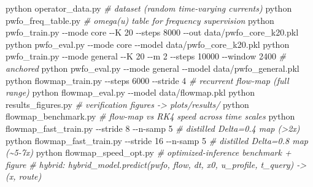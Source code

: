 \documentclass[
  11pt,
]{article}
\newenvironment{Shaded}{}{}
\newcommand{\AttributeTok}[1]{\textcolor[rgb]{0.49,0.56,0.16}{#1}}
\newcommand{\CommentTok}[1]{\textcolor[rgb]{0.38,0.63,0.69}{\textit{#1}}}
\newcommand{\ExtensionTok}[1]{#1}
\newcommand{\NormalTok}[1]{#1}
\begin{document}
\begin{Shaded}
\begin{Highlighting}[]
\ExtensionTok{python}\NormalTok{ operator\_data.py                                   }\CommentTok{\# dataset (random time{-}varying currents)}
\ExtensionTok{python}\NormalTok{ pwfo\_freq\_table.py                                 }\CommentTok{\# omega(u) table for frequency supervision}
\ExtensionTok{python}\NormalTok{ pwfo\_train.py }\AttributeTok{{-}{-}mode}\NormalTok{ core }\AttributeTok{{-}{-}K}\NormalTok{ 20 }\AttributeTok{{-}{-}steps}\NormalTok{ 8000  }\AttributeTok{{-}{-}out}\NormalTok{ data/pwfo\_core\_k20.pkl}
\ExtensionTok{python}\NormalTok{ pwfo\_eval.py  }\AttributeTok{{-}{-}mode}\NormalTok{ core   }\AttributeTok{{-}{-}model}\NormalTok{ data/pwfo\_core\_k20.pkl}
\ExtensionTok{python}\NormalTok{ pwfo\_train.py }\AttributeTok{{-}{-}mode}\NormalTok{ general }\AttributeTok{{-}{-}K}\NormalTok{ 20 }\AttributeTok{{-}{-}m}\NormalTok{ 2 }\AttributeTok{{-}{-}steps}\NormalTok{ 10000 }\AttributeTok{{-}{-}window}\NormalTok{ 2400   }\CommentTok{\# anchored}
\ExtensionTok{python}\NormalTok{ pwfo\_eval.py  }\AttributeTok{{-}{-}mode}\NormalTok{ general }\AttributeTok{{-}{-}model}\NormalTok{ data/pwfo\_general.pkl}
\ExtensionTok{python}\NormalTok{ flowmap\_train.py }\AttributeTok{{-}{-}steps}\NormalTok{ 6000 }\AttributeTok{{-}{-}stride}\NormalTok{ 4           }\CommentTok{\# recurrent flow{-}map (full range)}
\ExtensionTok{python}\NormalTok{ flowmap\_eval.py  }\AttributeTok{{-}{-}model}\NormalTok{ data/flowmap.pkl}
\ExtensionTok{python}\NormalTok{ results\_figures.py                                 }\CommentTok{\# verification figures {-}\textgreater{} plots/results/}
\ExtensionTok{python}\NormalTok{ flowmap\_benchmark.py                               }\CommentTok{\# flow{-}map vs RK4 speed across time scales}
\ExtensionTok{python}\NormalTok{ flowmap\_fast\_train.py }\AttributeTok{{-}{-}stride}\NormalTok{ 8  }\AttributeTok{{-}{-}n{-}samp}\NormalTok{ 5       }\CommentTok{\# distilled Delta=0.4 map (\textgreater{}2x)}
\ExtensionTok{python}\NormalTok{ flowmap\_fast\_train.py }\AttributeTok{{-}{-}stride}\NormalTok{ 16 }\AttributeTok{{-}{-}n{-}samp}\NormalTok{ 5       }\CommentTok{\# distilled Delta=0.8 map (\textasciitilde{}5{-}7x)}
\ExtensionTok{python}\NormalTok{ flowmap\_speed\_opt.py                               }\CommentTok{\# optimized{-}inference benchmark + figure}
\CommentTok{\# hybrid: hybrid\_model.predict(pwfo, flow, dt, x0, u\_profile, t\_query) {-}\textgreater{} (x, route)}
\end{Highlighting}
\end{Shaded}
\end{document}
